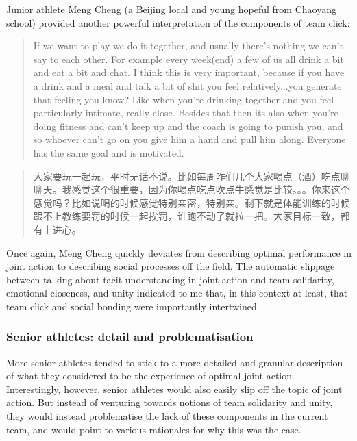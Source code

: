 \begin{CJK}{UTF8}{gbsn}
Junior athlete Meng Cheng (a Beijing local and young hopeful from Chaoyang school) provided another powerful interpretation of the components of team click:

      \begin{quotation}
        If we want to play we do it together, and usually there’s nothing we can’t say to each other. For example every week(end) a few of us all drink a bit and eat a bit and chat.  I think this is very important, because if you have a drink and a meal and talk a bit of shit you feel relatively...you generate that feeling you know? Like when you’re drinking together and you feel particularly intimate, really close.  Besides that then its also when you’re doing fitness and can’t keep up and the coach is going to punish you, and so whoever can’t go on you give him a hand and pull him along.  Everyone has the same goal and is motivated.
      \end{quotation}

      \begin{quotation}
        大家要玩一起玩，平时无话不说。比如每周咋们几个大家喝点（酒）吃点聊聊天。我感觉这个很重要，因为你喝点吃点吹点牛感觉是比较。。。你来这个感觉吗？比如说喝的时候感觉特别亲密，特别亲。剩下就是体能训练的时候跟不上教练要罚的时候一起挨罚，谁跑不动了就拉一把。大家目标一致，都有上进心。 
      \end{quotation}

Once again, Meng Cheng quickly deviates from describing optimal performance in joint action to describing social processes off the field.  The automatic slippage between talking about tacit understanding in joint action and team solidarity, emotional closeness, and unity indicated to me that, in this context at least, that team click and social bonding were importantly intertwined.


\subsubsection{Senior athletes: detail and problematisation}
More senior athletes tended to stick to a more detailed and granular description of what they considered to be the experience of optimal joint action. Interestingly, however, senior athletes would also easily slip off the topic of joint action.  But instead of venturing towards notions of team solidarity and unity, they would instead problematise the lack of these components in the current team, and would point to various rationales for why this was the case.


\end{CJK}
